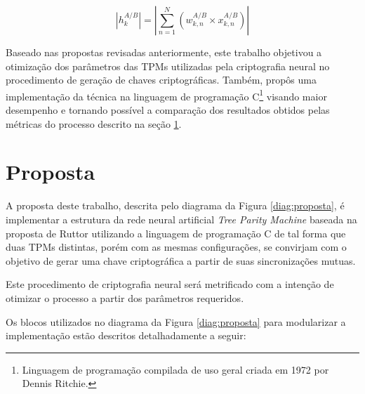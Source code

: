 \documentclass[a4paper,10pt,oneside,conference,final,keeplastbox]{inatel}
\begin{document}
        \begin{equation}
            \label{eq:fakeMsg}
            \left | h_{k}^{A/B} \right | = \left | \displaystyle\sum_{n=1}^{N} (w_{k, n}^{A/B} \times x_{k, n}^{A/B}) \right |
        \end{equation}

        Baseado nas propostas revisadas anteriormente, este trabalho objetivou a otimização dos parâmetros das TPMs utilizadas pela criptografia neural no procedimento de geração de chaves criptográficas. Também, propôs uma implementação da técnica na linguagem de programação C\footnote{Linguagem de programação compilada de uso geral criada em 1972 por Dennis Ritchie.} visando maior desempenho e tornando possível a comparação dos resultados obtidos pelas métricas do processo descrito na seção \ref{sec:proposta}.
  
  
    \section{Proposta}
    \label{sec:proposta}
        
        A proposta deste trabalho, descrita pelo diagrama da Figura \ref{diag:proposta}, é implementar a estrutura da rede neural artificial \textit{Tree Parity Machine} baseada na proposta de Ruttor \cite{ruttor2007neural} utilizando a linguagem de programação C de tal forma que duas TPMs distintas, porém com as mesmas configurações, se convirjam com o objetivo de gerar uma chave criptográfica a partir de suas sincronizações mutuas.
        
        Este procedimento de criptografia neural será metrificado com a intenção de otimizar o processo a partir dos parâmetros requeridos.
        
        Os blocos utilizados no diagrama da Figura \ref{diag:proposta} para modularizar a implementação estão descritos detalhadamente a seguir: 
        
\end{document}
